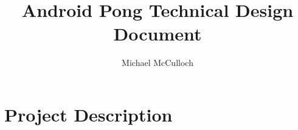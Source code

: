 \documentclass[12pt, letterpaper]{article}
\title{Android Pong Technical Design Document}
\author{Michael McCulloch}
\begin{document}
\maketitle
\pagebreak
\tableofcontents
\pagebreak
\section{Project Description}
\end{document}
